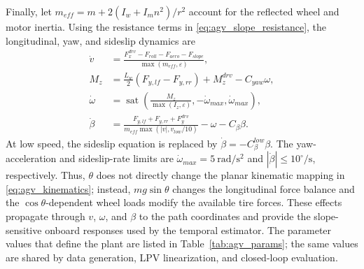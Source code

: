 \documentclass{ieeeaccess}
\begin{document}
Finally, let $m_{eff}=m+2(I_w+I_mn^2)/r^2$ account for the reflected wheel and motor inertia. Using the resistance terms in \eqref{eq:agv_slope_resistance}, the longitudinal, yaw, and sideslip dynamics are
\begin{equation}
\begin{aligned}
\dot v&=\frac{F_x^{drv}-F_{roll}-F_{aero}-F_{slope}}
{\max(m_{eff},\varepsilon)},\\
M_z&=\frac{L_w}{2}(F_{y,lf}-F_{y,rr})+M_z^{drv}-C_{yaw}\omega,\\
\dot\omega&=\operatorname{sat}\!\left(
\frac{M_z}{\max(I_z,\varepsilon)},-\dot\omega_{max},\dot\omega_{max}\right),\\
\dot\beta&=\frac{F_{y,lf}+F_{y,rr}+F_y^{drv}}
{m_{eff}\max(|v|,v_{low}/10)}-\omega-C_{\beta}\beta.
\end{aligned}
\label{eq:agv_continuous_dynamics}
\end{equation}
At low speed, the sideslip equation is replaced by $\dot\beta=-C_{\beta}^{low}\beta$. The yaw-acceleration and sideslip-rate limits are $\dot\omega_{max}=5~\mathrm{rad/s^2}$ and $|\dot\beta|\leq10^{\circ}/\mathrm{s}$, respectively. Thus, $\theta$ does not directly change the planar kinematic mapping in \eqref{eq:agv_kinematics}; instead, $mg\sin\theta$ changes the longitudinal force balance and the $\cos\theta$-dependent wheel loads modify the available tire forces. These effects propagate through $v$, $\omega$, and $\beta$ to the path coordinates and provide the slope-sensitive onboard responses used by the temporal estimator. The parameter values that define the plant are listed in Table~\ref{tab:agv_params}; the same values are shared by data generation, LPV linearization, and closed-loop evaluation.
\end{document}
